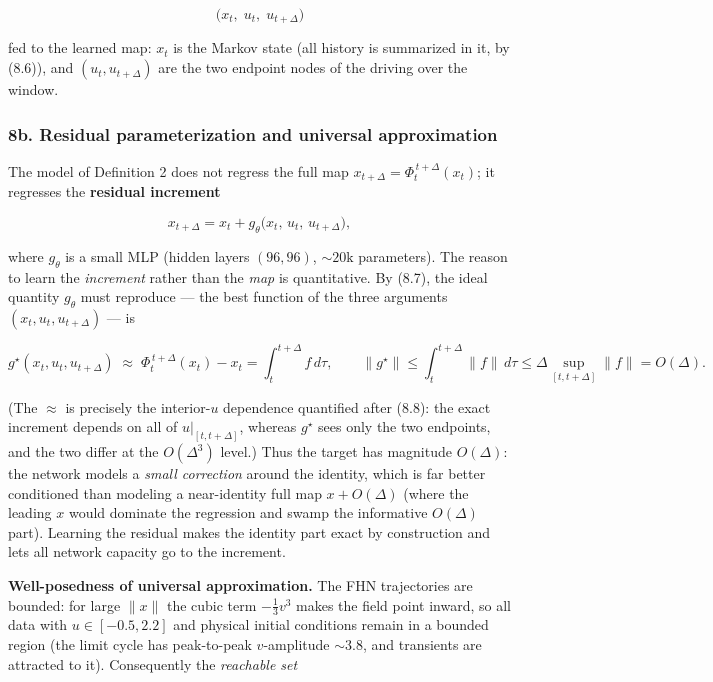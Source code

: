 \documentclass[
  11pt,
]{article}
\begin{document}
\[
\big(x_{t},\;u_{t},\;u_{t+\Delta}\big)
\tag{8.8}
\]

fed to the learned map: \(x_{t}\) is the Markov state (all history is
summarized in it, by (8.6)), and \((u_{t},u_{t+\Delta})\) are the two
endpoint nodes of the driving over the window.

\subsubsection{8b. Residual parameterization and universal
approximation}\label{b.-residual-parameterization-and-universal-approximation}

The model of Definition 2 does not regress the full map
\(x_{t+\Delta}=\Phi_{t}^{\,t+\Delta}(x_t)\); it regresses the
\textbf{residual increment}

\[
x_{t+\Delta}=x_{t}+g_{\theta}\big(x_{t},\,u_{t},\,u_{t+\Delta}\big),
\tag{8.9}
\]

where \(g_{\theta}\) is a small MLP (hidden layers \((96,96)\),
\(\sim\!20\text{k}\) parameters). The reason to learn the
\emph{increment} rather than the \emph{map} is quantitative. By (8.7),
the ideal quantity \(g_\theta\) must reproduce --- the best function of
the three arguments \((x_t,u_t,u_{t+\Delta})\) --- is

\[
g^{\star}(x_{t},u_{t},u_{t+\Delta})\;\approx\;\Phi_{t}^{\,t+\Delta}(x_{t})-x_{t}=\int_{t}^{t+\Delta} f\,d\tau,
\qquad \big\|g^{\star}\big\|\le \int_{t}^{t+\Delta}\!\|f\|\,d\tau\le \Delta\!\!\sup_{[t,t+\Delta]}\!\|f\|=O(\Delta).
\tag{8.10}
\]

(The \(\approx\) is precisely the interior-\(u\) dependence quantified
after (8.8): the exact increment depends on all of
\(u|_{[t,t+\Delta]}\), whereas \(g^\star\) sees only the two endpoints,
and the two differ at the \(O(\Delta^3)\) level.) Thus the target has
magnitude \(O(\Delta)\): the network models a \emph{small correction}
around the identity, which is far better conditioned than modeling a
near-identity full map \(x+O(\Delta)\) (where the leading \(x\) would
dominate the regression and swamp the informative \(O(\Delta)\) part).
Learning the residual makes the identity part exact by construction and
lets all network capacity go to the increment.

\textbf{Well-posedness of universal approximation.} The FHN trajectories
are bounded: for large \(\|x\|\) the cubic term \(-\tfrac13 v^{3}\)
makes the field point inward, so all data with \(u\in[-0.5,2.2]\) and
physical initial conditions remain in a bounded region (the limit cycle
has peak-to-peak \(v\)-amplitude \(\sim 3.8\), and transients are
attracted to it). Consequently the \emph{reachable set}
\end{document}
